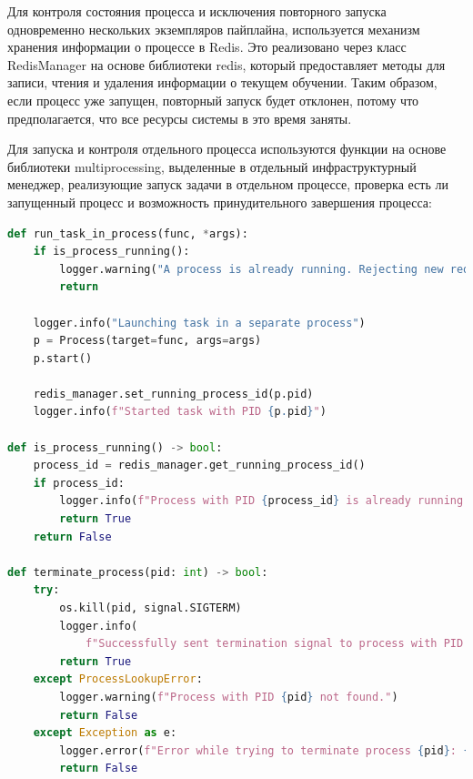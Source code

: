 Для контроля состояния процесса и исключения повторного запуска одновременно нескольких экземпляров пайплайна, используется механизм хранения информации о процессе в Redis. Это реализовано через класс RedisManager на основе библиотеки redis, который предоставляет методы для записи, чтения и удаления информации о текущем обучении. Таким образом, если процесс уже запущен, повторный запуск будет отклонен, потому что предполагается, что все ресурсы системы в это время заняты.

Для запуска и контроля отдельного процесса используются функции на основе библиотеки multiprocessing, выделенные в отдельный инфраструктурный менеджер, реализующие запуск задачи в отдельном процессе, проверка есть ли запущенный процесс и возможность принудительного завершения процесса:
\begin{lstlisting}[language=Python, numbers=none, frame=none]
def run_task_in_process(func, *args):
    if is_process_running():
        logger.warning("A process is already running. Rejecting new request.")
        return

    logger.info("Launching task in a separate process")
    p = Process(target=func, args=args)
    p.start()

    redis_manager.set_running_process_id(p.pid)
    logger.info(f"Started task with PID {p.pid}")

def is_process_running() -> bool:
    process_id = redis_manager.get_running_process_id()
    if process_id:
        logger.info(f"Process with PID {process_id} is already running.")
        return True
    return False

def terminate_process(pid: int) -> bool:
    try:
        os.kill(pid, signal.SIGTERM)
        logger.info(
            f"Successfully sent termination signal to process with PID {pid}")
        return True
    except ProcessLookupError:
        logger.warning(f"Process with PID {pid} not found.")
        return False
    except Exception as e:
        logger.error(f"Error while trying to terminate process {pid}: {e}")
        return False
\end{lstlisting}


